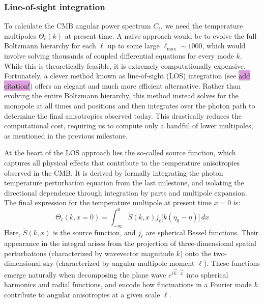 \documentclass{aa}
\numberwithin{equation}{section}
\numberwithin{table}{section}
\numberwithin{figure}{section}
\begin{document}
\subsubsection{Line-of-sight integration}\label{subsubsec: IV theory LOS}
To calculate the CMB angular power spectrum $C_\ell$, we need the temperature multipoles $\Theta_\ell(k)$ at present time. A naive approach would be to evolve the full Boltzmann hierarchy for each $\ell$ up to some large $\ell_{\text{max}} \sim 1000$, which would involve solving thousands of coupled differential equations for every mode $k$. While this is theoretically feasible, it is extremely computationally expensive. Fortunately, a clever method known as line-of-sight (LOS) integration (see \colorbox{Plum}{add citation!}) offers an elegant and much more efficient alternative.
Rather than evolving the entire Boltzmann hierarchy, this method instead solves for the monopole at all times and positions and then integrates over the photon path to determine the final anisotropies observed today. This drastically reduces the computational cost, requiring us to compute only a handful of lower multipoles, as mentioned in the previous milestone.

At the heart of the LOS approach lies the so-called source function, which captures all physical effects that contribute to the temperature anisotropies observed in the CMB. It is derived by formally integrating the photon temperature perturbation equation from the last milestone, and isolating the directional dependence through integration by parts and multipole expansion. The final expression for the temperature multipole at present time $x = 0$ is:
\begin{equation}
\Theta_\ell(k, x=0) = \int_{-\infty}^{0} \tilde{S}(k, x) j_\ell\big[k(\eta_0 - \eta)\big]\, dx \label{eq: multipoles LOS}
\end{equation}
Here, $\tilde{S}(k, x)$ is the source function, and $j_\ell$ are spherical Bessel functions. Their appearance in the integral arises from the projection of three-dimensional spatial perturbations (characterized by wavevector magnitude $k$) onto the two-dimensional sky (characterized by angular multipole moment $\ell$). These functions emerge naturally when decomposing the plane wave $e^{i \vec{k} \cdot \vec{x}}$ into spherical harmonics and radial functions, and encode how fluctuations in a Fourier mode $k$ contribute to angular anisotropies at a given scale $\ell$. 
\end{document}
